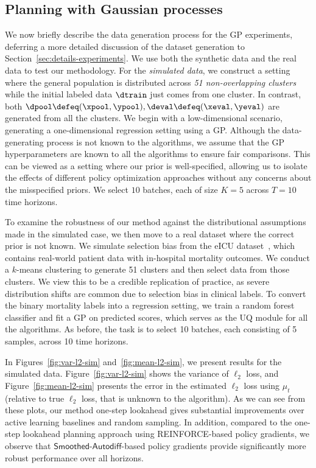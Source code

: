 \subsection{Planning with Gaussian processes}
\label{sec:experiment-plan-GP}
We now briefly describe the data generation process for the GP experiments,  deferring a more detailed discussion of the dataset generation to Section~\ref{sec:details-experiments}. 
We use both the synthetic data and the real data to test our methodology.
For the \emph{simulated data},  we construct a setting where the general population is distributed across \emph{51 non-overlapping clusters} while the initial labeled data $\dtrain$ just comes from one cluster. In contrast, both $\dpool \defeq (\xpool,\ypool),\deval \defeq (\xeval,\yeval)$ are generated   from all the clusters. 
We begin with a low-dimensional scenario, generating a one-dimensional regression setting using a GP. %
Although the data-generating process is not known to the algorithms,  we assume that the GP hyperparameters are known to all the algorithms
to ensure fair comparisons. This can be viewed as a setting where our prior is well-specified, allowing us to isolate the effects
of different policy optimization approaches
 without any concerns about the misspecified priors. We select $10$ batches, each of size $K=5$ across $T = 10$ time horizons.

To examine the robustness of our method against the distributional assumptions made  in the simulated case, we then move to a real dataset where the correct prior is not known. We simulate selection bias from the eICU dataset~\citep{PollardJoRaCeMaBa18}, which contains real-world patient data with in-hospital mortality outcomes. 
We conduct a $k$-means clustering to generate 51 clusters and then select data from those clusters. We view this to be a credible replication of practice, as severe distribution shifts are common due to selection bias in clinical labels.  To convert the binary mortality labels into a regression setting, we train a  random forest classifier and fit a GP on predicted scores, which serves as the UQ module for all the algorithms. As before, the task is to select 10 batches, each consisting of 5 samples, across 10 time horizons.

 In Figures~\ref{fig:var-l2-sim} and~\ref{fig:mean-l2-sim}, we present results for the simulated data. 
Figure~\ref{fig:var-l2-sim} shows the variance of $\ell_2$ loss, and Figure~\ref{fig:mean-l2-sim} presents the error in the estimated $\ell_2$ loss using $\mu_t$ (relative to true $\ell_2$ loss, that is unknown to the algorithm). 
As we can see from these plots, our method one-step lookahead  gives substantial improvements  over active learning baselines and random sampling. In addition,
compared to the one-step lookahead planning approach using \textsf{REINFORCE}-based policy gradients, 
we observe that $\mathsf{Smoothed\text{-}Autodiff}$-based policy gradients provide significantly more robust performance over all horizons.

